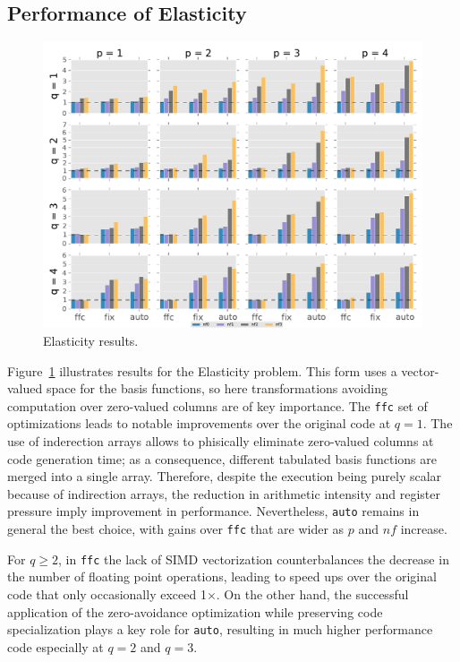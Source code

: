 \subsection{Performance of Elasticity}
\begin{figure}[t]
\centerline{\includegraphics[scale=0.7]{coffee/perf-results/allforms/elasticity}}
\caption{Elasticity results.}\label{fig:coffee-allforms-elasticity}
\end{figure}
Figure~\ref{fig:coffee-allforms-elasticity} illustrates results for the Elasticity problem. This form uses a vector-valued space for the basis functions, so here transformations avoiding computation over zero-valued columns are of key importance. The \texttt{ffc} set of optimizations leads to notable improvements over the original code at $q=1$. The use of inderection arrays allows to phisically eliminate zero-valued columns at code generation time; as a consequence, different tabulated basis functions are merged into a single array. Therefore, despite the execution being purely scalar because of indirection arrays, the reduction in arithmetic intensity and register pressure imply improvement in performance. Nevertheless, \texttt{auto} remains in general the best choice, with gains over \texttt{ffc} that are wider as $p$ and $nf$ increase. 

For $q \geq 2$, in \texttt{ffc} the lack of SIMD vectorization counterbalances the decrease in the number of floating point operations, leading to speed ups over the original code that only occasionally exceed 1$\times$. On the other hand, the successful application of the zero-avoidance optimization while preserving code specialization plays a key role for \texttt{auto}, resulting in much higher performance code especially at $q=2$ and $q=3$. 

